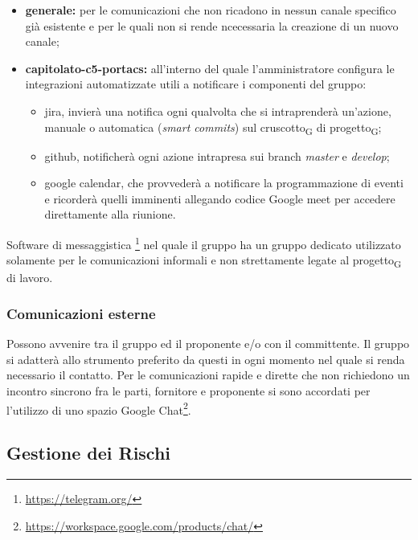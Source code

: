             \begin{itemize}
                \item \textbf{generale: }per le comunicazioni che non ricadono in nessun canale specifico già esistente e per le quali non si rende ncecessaria la creazione di un nuovo canale;
                \item \textbf{capitolato-c5-portacs: }all'interno del quale l'amministratore configura le integrazioni automatizzate utili a notificare i componenti del gruppo:
                \begin{itemize}
                    \item jira, invierà una notifica ogni qualvolta che si intraprenderà un'azione, manuale o automatica (\textit{smart commits}) sul cruscotto\textsubscript{G} di progetto\textsubscript{G};
                    \item github, notificherà ogni azione intrapresa sui branch \textit{master} e \textit{develop};
                    \item google calendar, che provvederà a notificare la programmazione di eventi e ricorderà quelli imminenti allegando codice Google meet per accedere direttamente alla riunione.
                \end{itemize}
            \end{itemize}
            Software di messaggistica \footnote{\url{https://telegram.org/}} nel quale il gruppo \group ha un gruppo dedicato utilizzato solamente per le comunicazioni informali e non strettamente legate al progetto\textsubscript{G} di lavoro.
    \subsubsection{Comunicazioni esterne}
        Possono avvenire tra il gruppo \group ed il proponente e/o con il committente. Il gruppo si adatterà allo strumento preferito da questi in ogni momento nel quale si renda necessario il contatto. Per le comunicazioni rapide e dirette che non richiedono un incontro sincrono fra le parti, fornitore e proponente si sono accordati per l'utilizzo di uno spazio Google Chat\footnote{\url{https://workspace.google.com/products/chat/}}.

\subsection{Gestione dei Rischi}
